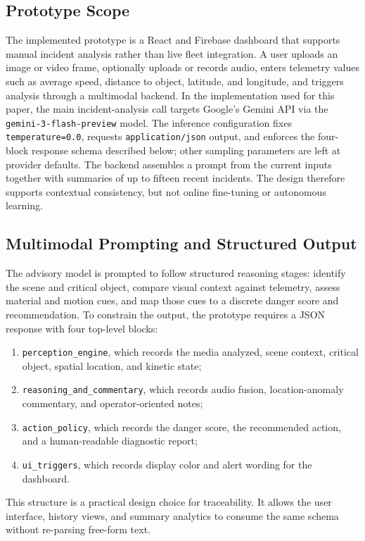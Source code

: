 \documentclass[conference]{IEEEtran}
\newcommand{\codefont}[1]{\texttt{#1}}
\begin{document}
\subsection{Prototype Scope}
The implemented prototype is a React and Firebase dashboard that supports manual incident analysis rather than live fleet integration. A user uploads an image or video frame, optionally uploads or records audio, enters telemetry values such as average speed, distance to object, latitude, and longitude, and triggers analysis through a multimodal backend. In the implementation used for this paper, the main incident-analysis call targets Google's Gemini API via the \codefont{gemini-3-flash-preview} model. The inference configuration fixes \codefont{temperature=0.0}, requests \codefont{application/json} output, and enforces the four-block response schema described below; other sampling parameters are left at provider defaults. The backend assembles a prompt from the current inputs together with summaries of up to fifteen recent incidents. The design therefore supports contextual consistency, but not online fine-tuning or autonomous learning.

\subsection{Multimodal Prompting and Structured Output}
The advisory model is prompted to follow structured reasoning stages: identify the scene and critical object, compare visual context against telemetry, assess material and motion cues, and map those cues to a discrete danger score and recommendation. To constrain the output, the prototype requires a JSON response with four top-level blocks:
\begin{enumerate}
    \item \codefont{perception\_engine}, which records the media analyzed, scene context, critical object, spatial location, and kinetic state;
    \item \codefont{reasoning\_and\_commentary}, which records audio fusion, location-anomaly commentary, and operator-oriented notes;
    \item \codefont{action\_policy}, which records the danger score, the recommended action, and a human-readable diagnostic report;
    \item \codefont{ui\_triggers}, which records display color and alert wording for the dashboard.
\end{enumerate}
This structure is a practical design choice for traceability. It allows the user interface, history views, and summary analytics to consume the same schema without re-parsing free-form text.
\end{document}
